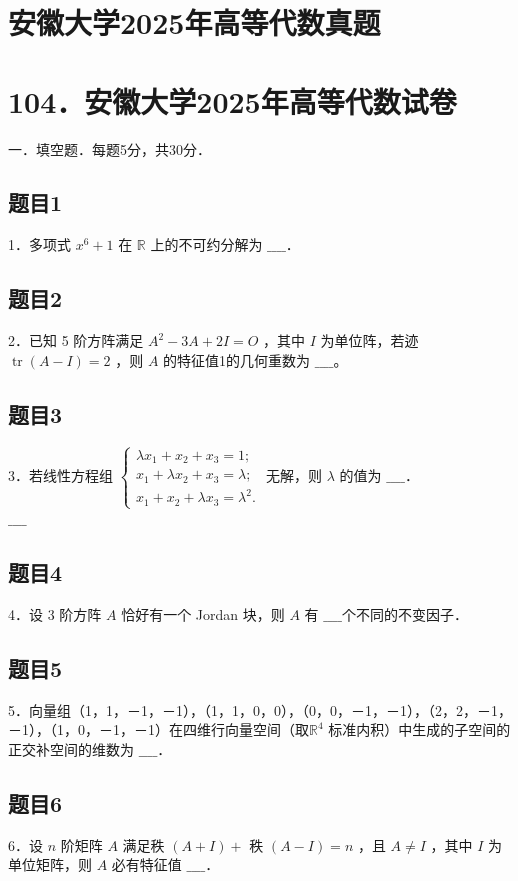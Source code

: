 \documentclass{article}
\begin{document}
\section*{安徽大学2025年高等代数真题}
\section*{104．安徽大学2025年高等代数试卷}
一．填空题．每题5分，共30分．\\

\subsection{题目1}
1．多项式 \(x^{6}+1\) 在 \(\mathbb{R}\) 上的不可约分解为 \(\_\_\_\_\)．

\subsection{题目2}
2．已知 5 阶方阵满足 \(A^{2}-3 A+2 I=O\) ，其中 \(I\) 为单位阵，若迹 \(\operatorname{tr}(A-I)=2\) ，则 \(A\) 的特征值1的几何重数为 \(\_\_\_\_\)。

\subsection{题目3}
3．若线性方程组 \(\left\{\begin{array}{l}\lambda x_{1}+x_{2}+x_{3}=1 ; \\ x_{1}+\lambda x_{2}+x_{3}=\lambda ; \\ x_{1}+x_{2}+\lambda x_{3}=\lambda^{2} .\end{array}\right.\) 无解，则 \(\lambda\) 的值为 \(\_\_\_\_\)．\\
\(\_\_\_\_\)

\subsection{题目4}
4．设 3 阶方阵 \(A\) 恰好有一个 Jordan 块，则 \(A\) 有 \(\_\_\_\_\)个不同的不变因子．

\subsection{题目5}
5．向量组（1，1，－1，－1），（1，1，0，0），（0，0，－1，－1），（2，2，－1，－1），（1，0，－1，－1）在四维行向量空间（取\(\mathbb{R}^{4}\) 标准内积）中生成的子空间的正交补空间的维数为 \(\_\_\_\_\)．

\subsection{题目6}
6．设 \(n\) 阶矩阵 \(A\) 满足秩 \((A+I)+\) 秩 \((A-I)=n\) ，且 \(A \neq I\) ，其中 \(I\) 为单位矩阵，则 \(A\) 必有特征值 \(\_\_\_\_\)．
\end{document}
